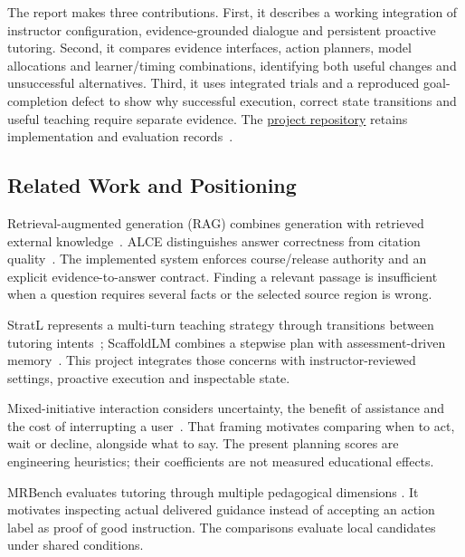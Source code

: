 The report makes three contributions. First, it describes a working integration
of instructor configuration, evidence-grounded dialogue and persistent proactive
tutoring. Second, it compares evidence interfaces, action planners, model
allocations and learner/timing combinations, identifying both useful changes
and unsuccessful alternatives. Third, it uses integrated trials and a reproduced
goal-completion defect to show why successful execution, correct state transitions
and useful teaching require separate evidence. The \href{https://github.com/horiiiiii032929/digital-twin}{project
repository} retains implementation and evaluation records~\cite{horinouchi2026digitaltwin}.

\subsection{Related Work and Positioning}
Retrieval-augmented generation (RAG) combines generation with retrieved external knowledge~\cite{lewis2020retrieval}.
ALCE distinguishes answer correctness from citation quality~\cite{gao2023citations}.
The implemented system enforces course/release authority and an explicit evidence-to-answer
contract. Finding a relevant passage is insufficient when a question requires
several facts or the selected source region is wrong.

StratL represents a multi-turn teaching strategy through transitions between
tutoring intents~\cite{puech-etal-2025-towards}; ScaffoldLM combines a stepwise plan
with assessment-driven memory~\cite{li-etal-2026-planning}. This project integrates those concerns with instructor-reviewed settings,
proactive execution and inspectable state.

Mixed-initiative interaction considers uncertainty, the benefit of assistance
and the cost of interrupting a user~\cite{horvitz1999mixed}. That framing motivates
comparing when to act, wait or decline, alongside what to say. The present
planning scores are engineering heuristics; their coefficients are not measured
educational effects.

MRBench evaluates tutoring through multiple pedagogical dimensions
\cite{maurya-etal-2025-unifying}. It motivates inspecting actual delivered
guidance instead of accepting an action label as proof of good instruction.
The comparisons evaluate local candidates under shared conditions.
